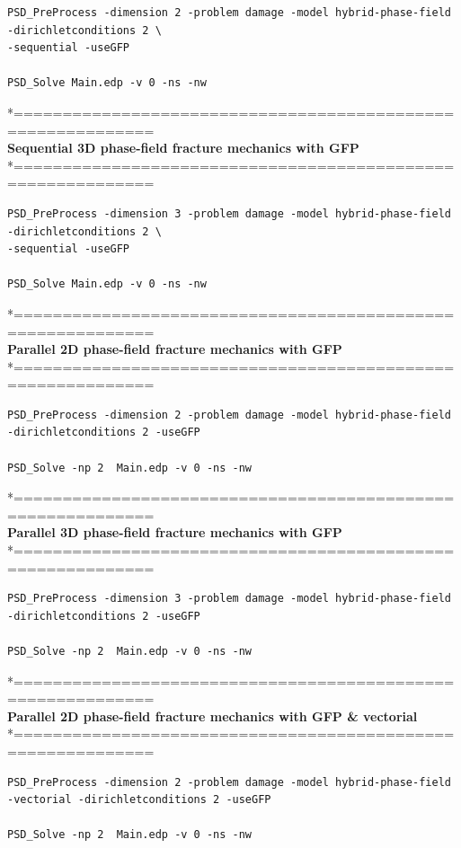 \begin{lstlisting}[style=BashInputStyle]
PSD_PreProcess -dimension 2 -problem damage -model hybrid-phase-field  -dirichletconditions 2 \
-sequential -useGFP   

PSD_Solve Main.edp -v 0 -ns -nw   
\end{lstlisting}
*============================================================\\
\textbf{ Sequential 3D phase-field fracture mechanics with GFP} \\
*============================================================\\
\begin{lstlisting}[style=BashInputStyle]
PSD_PreProcess -dimension 3 -problem damage -model hybrid-phase-field  -dirichletconditions 2 \
-sequential -useGFP   

PSD_Solve Main.edp -v 0 -ns -nw   
\end{lstlisting}
*============================================================\\
\textbf{ Parallel 2D phase-field fracture mechanics with GFP} \\
*============================================================\\
\begin{lstlisting}[style=BashInputStyle]
PSD_PreProcess -dimension 2 -problem damage -model hybrid-phase-field -dirichletconditions 2 -useGFP   

PSD_Solve -np 2  Main.edp -v 0 -ns -nw   
\end{lstlisting}
*============================================================\\
\textbf{ Parallel 3D phase-field fracture mechanics with GFP }\\
*============================================================\\
\begin{lstlisting}[style=BashInputStyle]
PSD_PreProcess -dimension 3 -problem damage -model hybrid-phase-field -dirichletconditions 2 -useGFP   

PSD_Solve -np 2  Main.edp -v 0 -ns -nw   
\end{lstlisting}
*============================================================\\
\textbf{ Parallel 2D phase-field fracture mechanics with GFP \& vectorial} \\
*============================================================\\
\begin{lstlisting}[style=BashInputStyle]
PSD_PreProcess -dimension 2 -problem damage -model hybrid-phase-field -vectorial -dirichletconditions 2 -useGFP   

PSD_Solve -np 2  Main.edp -v 0 -ns -nw   
\end{lstlisting}
